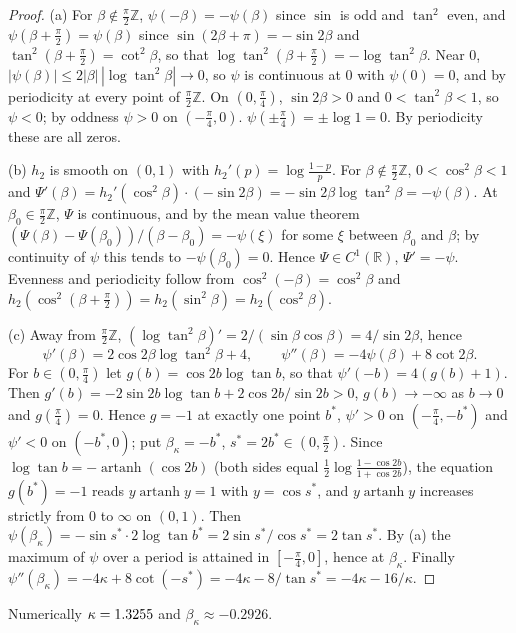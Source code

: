 \documentclass[11pt]{article}
\DeclareMathOperator{\artanh}{artanh}
\newcommand{\R}{\mathbb{R}}
\newcommand{\Z}{\mathbb{Z}}
\theoremstyle{plain}
\theoremstyle{definition}
\theoremstyle{remark}
\begin{document}
\begin{proof}
(a) For $\beta\notin\frac\pi2\Z$, $\psi(-\beta)=-\psi(\beta)$ since $\sin$ is odd and $\tan^2$ even, and
$\psi(\beta+\frac\pi2)=\psi(\beta)$ since $\sin(2\beta+\pi)=-\sin2\beta$ and $\tan^2(\beta+\frac\pi2)=\cot^2\beta$, so that
$\log\tan^2(\beta+\frac\pi2)=-\log\tan^2\beta$. Near $0$, $|\psi(\beta)|\le2|\beta|\,|\log\tan^2\beta|\to0$, so $\psi$ is
continuous at $0$ with $\psi(0)=0$, and by periodicity at every point of $\frac\pi2\Z$. On $(0,\frac\pi4)$, $\sin2\beta>0$ and
$0<\tan^2\beta<1$, so $\psi<0$; by oddness $\psi>0$ on $(-\frac\pi4,0)$. $\psi(\pm\frac\pi4)=\pm\log1=0$. By periodicity these
are all zeros.

(b) $h_2$ is smooth on $(0,1)$ with $h_2'(p)=\log\frac{1-p}p$. For $\beta\notin\frac\pi2\Z$, $0<\cos^2\beta<1$ and
$\Psi'(\beta)=h_2'(\cos^2\beta)\cdot(-\sin2\beta)=-\sin2\beta\log\tan^2\beta=-\psi(\beta)$. At $\beta_0\in\frac\pi2\Z$, $\Psi$ is
continuous, and by the mean value theorem $(\Psi(\beta)-\Psi(\beta_0))/(\beta-\beta_0)=-\psi(\xi)$ for some $\xi$ between
$\beta_0$ and $\beta$; by continuity of $\psi$ this tends to $-\psi(\beta_0)=0$. Hence $\Psi\in C^1(\R)$, $\Psi'=-\psi$. Evenness and
periodicity follow from $\cos^2(-\beta)=\cos^2\beta$ and $h_2(\cos^2(\beta+\frac\pi2))=h_2(\sin^2\beta)=h_2(\cos^2\beta)$.

(c) Away from $\frac\pi2\Z$, $(\log\tan^2\beta)'=2/(\sin\beta\cos\beta)=4/\sin2\beta$, hence
\[
  \psi'(\beta)=2\cos2\beta\log\tan^2\beta+4,\qquad \psi''(\beta)=-4\psi(\beta)+8\cot2\beta .
\]
For $b\in(0,\frac\pi4)$ let $g(b)=\cos2b\log\tan b$, so that $\psi'(-b)=4(g(b)+1)$. Then $g'(b)=-2\sin2b\log\tan b+2\cos2b/\sin2b>0$,
$g(b)\to-\infty$ as $b\to0$ and $g(\frac\pi4)=0$. Hence $g=-1$ at exactly one point $b^*$, $\psi'>0$ on $(-\frac\pi4,-b^*)$ and
$\psi'<0$ on $(-b^*,0)$; put $\beta_\kappa=-b^*$, $s^*=2b^*\in(0,\frac\pi2)$. Since $\log\tan b=-\artanh(\cos2b)$ (both sides equal
$\frac12\log\frac{1-\cos2b}{1+\cos2b}$), the equation $g(b^*)=-1$ reads $y\artanh y=1$ with $y=\cos s^*$, and $y\artanh y$ increases
strictly from $0$ to $\infty$ on $(0,1)$. Then $\psi(\beta_\kappa)=-\sin s^*\cdot2\log\tan b^*=2\sin s^*/\cos s^*=2\tan s^*$. By (a)
the maximum of $\psi$ over a period is attained in $[-\frac\pi4,0]$, hence at $\beta_\kappa$. Finally
$\psi''(\beta_\kappa)=-4\kappa+8\cot(-s^*)=-4\kappa-8/\tan s^*=-4\kappa-16/\kappa$.
\end{proof}

\noindent Numerically $\kappa=1.3255$ and $\beta_\kappa\approx-0.2926$.
\end{document}
